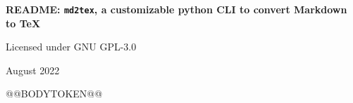 \documentclass[a4paper, 12pt, twoside]{@@DOCUMENTCLASSTOKEN@@}
\begin{document}
	\onehalfspacing

	\begin{titlepage}
		\begin{center}
			\bigskip

			\vfill

			\begin{Huge}
				\textbf{README: \texttt{md2tex}, a customizable python CLI to convert Markdown to TeX}
			\end{Huge}

			\vfill

			\begin{large}
				Licensed under GNU GPL-3.0

				\bigskip

				August 2022
			\end{large}

		\end{center}
	\end{titlepage}

@@BODYTOKEN@@

\clearpage
\tableofcontents
\end{document}
